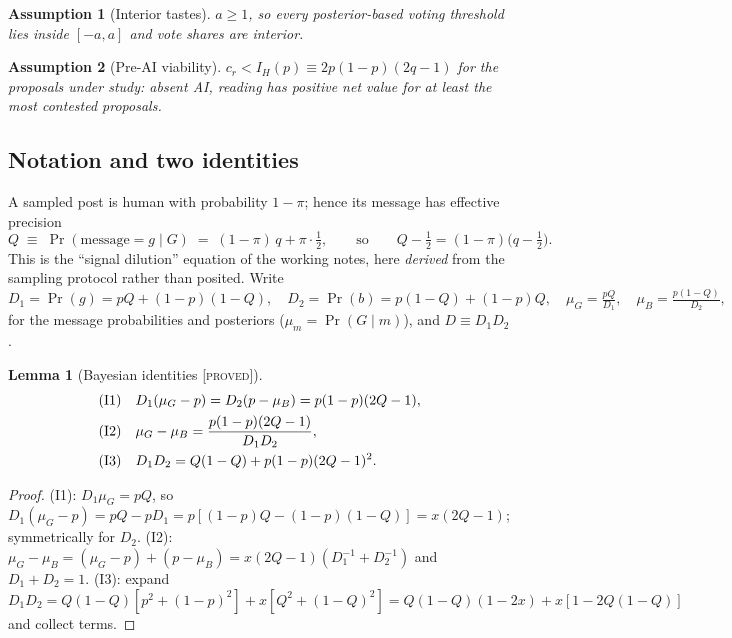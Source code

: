 \documentclass[11pt]{article}
\newtheorem{lemma}{Lemma}
\newtheorem{assumption}{Assumption}
\theoremstyle{remark}
\newcommand{\Pro}{\Pr}
\newcommand{\statusP}{\textsc{[proved]}}
\begin{document}
\begin{assumption}[Interior tastes]\label{ass:interior}
$a\ge 1$, so every posterior-based voting threshold lies inside $[-a,a]$ and
vote shares are interior.
\end{assumption}

\begin{assumption}[Pre-AI viability]\label{ass:viable}
$c_r< I_H(p)\equiv 2p(1-p)(2q-1)$ for the proposals under study: absent AI,
reading has positive net value for at least the most contested proposals.
\end{assumption}

\subsection{Notation and two identities}

A sampled post is human with probability $1-\pi$; hence its message has
effective precision
\begin{equation}\label{eq:Qeff}
Q \;\equiv\; \Pro(\text{message}=g\mid G)\;=\;(1-\pi)\,q+\pi\cdot\tfrac12,
\qquad\text{so}\qquad Q-\tfrac12=(1-\pi)\bigl(q-\tfrac12\bigr).
\end{equation}
This is the ``signal dilution'' equation of the working notes, here \emph{derived}
from the sampling protocol rather than posited. Write
\[
D_1=\Pro(g)=pQ+(1-p)(1-Q),\quad D_2=\Pro(b)=p(1-Q)+(1-p)Q,\quad
\mu_G=\tfrac{pQ}{D_1},\quad \mu_B=\tfrac{p(1-Q)}{D_2},
\]
for the message probabilities and posteriors ($\mu_m=\Pro(G\mid m)$), and
$D\equiv D_1D_2$.

\begin{lemma}[Bayesian identities \statusP]\label{lem:identities}
\begin{align}
\textup{(I1)}\quad & D_1(\mu_G-p)=D_2(p-\mu_B)=p(1-p)(2Q-1),\\
\textup{(I2)}\quad & \mu_G-\mu_B=\frac{p(1-p)(2Q-1)}{D_1D_2},\\
\textup{(I3)}\quad & D_1D_2=Q(1-Q)+p(1-p)(2Q-1)^2.
\end{align}
\end{lemma}

\begin{proof}
(I1): $D_1\mu_G=pQ$, so $D_1(\mu_G-p)=pQ-pD_1=p[(1-p)Q-(1-p)(1-Q)]=x(2Q-1)$;
symmetrically for $D_2$. (I2): $\mu_G-\mu_B=(\mu_G-p)+(p-\mu_B)
=x(2Q-1)(D_1^{-1}+D_2^{-1})$ and $D_1+D_2=1$. (I3): expand
$D_1D_2=Q(1-Q)[p^2+(1-p)^2]+x[Q^2+(1-Q)^2]=Q(1-Q)(1-2x)+x[1-2Q(1-Q)]$ and
collect terms.
\end{proof}
\end{document}
